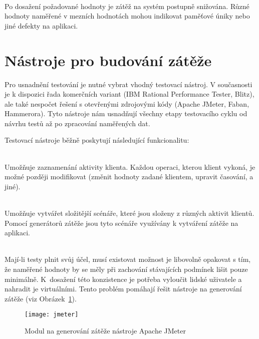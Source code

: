 \documentclass[122pt,oneside]{fithesis}
\begin{document}
\vspace{5 mm}
\\\indent Po dosažení požadované hodnoty je zátěž na systém postupně snižována. Různé hodnoty naměřené v mezních hodnotách mohou indikovat paměťové úniky nebo jiné defekty na aplikaci.

\section{Nástroje pro budování zátěže}

Pro usnadnění testování je nutné vybrat vhodný testovací nástroj. V současnosti je k dispozici řada komerčních variant (IBM Rational Performance Tester, Blitz), ale také nespočet řešení s otevřenými zdrojovými kódy (Apache JMeter, Faban, Hammerora). Tyto nástroje nám usnadňují všechny etapy testovacího cyklu od návrhu testů až po zpracování naměřených dat. 

Testovací nástroje běžně poskytují následující funkcionalitu:

\vspace{5 mm}
\\\indent Umožňuje zaznamenání aktivity klienta. Každou operaci, kterou klient vykoná, je možné později modifikovat (změnit hodnoty zadané klientem, upravit časování, a jiné).

\vspace{5 mm}
\\\indent Umožňuje vytvářet složitější scénáře, které jsou složeny z různých aktivit klientů. Pomocí generátorů zátěže jsou tyto scénáře využívány k vytváření zátěže na aplikaci.

\vspace{5 mm}
\\\indent Mají-li testy plnit svůj účel, musí existovat možnost je libovolně opakovat s tím, že naměřené hodnoty by se měly při zachování stávajících podmínek lišit pouze minimálně. K~dosažení této konzistence je potřeba vyloučit lidské uživatele a nahradit je virtuálními. Tento problém pomáhají řešit nástroje na generování zátěže (viz Obrázek~\ref{img:jmeter}).

\begin{figure}[!ht]
\centering
\texttt{[image: jmeter]}
\caption{Modul na generování zátěže nástroje Apache JMeter}
\label{img:jmeter}
\end{figure}
\end{document}
